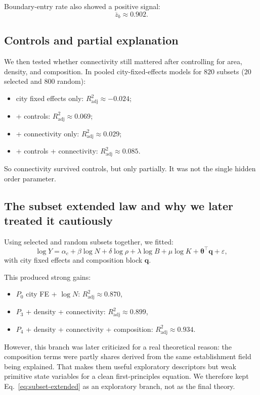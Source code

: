 \documentclass[11pt]{article}
\newcommand{\adjR}{R^2_{\mathrm{adj}}}
\begin{document}
Boundary-entry rate also showed a positive signal:
\begin{equation}
\overline{z}_{b} \approx 0.902.
\end{equation}

\subsection{Controls and partial explanation}

We then tested whether connectivity still mattered after controlling for area, density, and composition. In pooled city-fixed-effects models for \(820\) subsets (\(20\) selected and \(800\) random):
\begin{itemize}
\item city fixed effects only: \(\adjR \approx -0.024\);
\item + controls: \(\adjR \approx 0.069\);
\item + connectivity only: \(\adjR \approx 0.029\);
\item + controls + connectivity: \(\adjR \approx 0.085\).
\end{itemize}

So connectivity survived controls, but only partially. It was not the single hidden order parameter.

\subsection{The subset extended law and why we later treated it cautiously}

Using selected and random subsets together, we fitted:
\begin{equation}
\log Y
=
\alpha_c + \beta \log N + \delta \log \rho + \lambda \log B + \mu \log K + \bm{\theta}^\top \mathbf{q} + \varepsilon,
\label{eq:subset-extended}
\end{equation}
with city fixed effects and composition block \(\mathbf{q}\).

This produced strong gains:
\begin{itemize}
\item \(P_0\) city FE + \(\log N\): \(\adjR \approx 0.870\),
\item \(P_3\) + density + connectivity: \(\adjR \approx 0.899\),
\item \(P_4\) + density + connectivity + composition: \(\adjR \approx 0.934\).
\end{itemize}

However, this branch was later criticized for a real theoretical reason: the composition terms were partly shares derived from the same establishment field being explained. That makes them useful exploratory descriptors but weak primitive state variables for a clean first-principles equation. We therefore kept Eq.~\eqref{eq:subset-extended} as an exploratory branch, not as the final theory.
\end{document}

